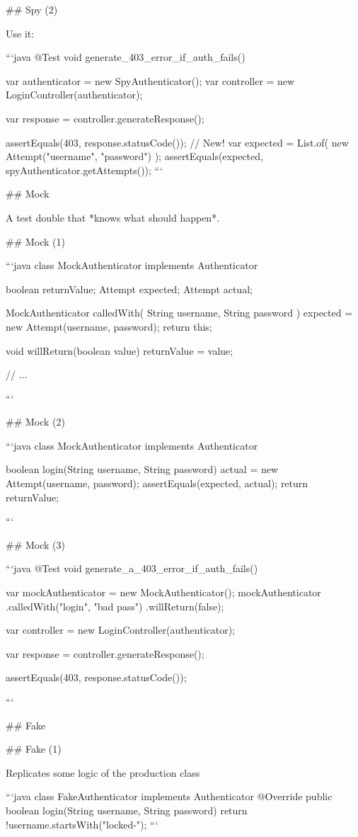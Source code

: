 ## Spy (2)

Use it:

```java
@Test
void generate_403_error_if_auth_fails() {
  var authenticator = new SpyAuthenticator();
  var controller = new LoginController(authenticator);

  var response = controller.generateResponse();

  assertEquals(403, response.statusCode());
  // New!
  var expected = List.of(
    new Attempt("username", "password")
  );
  assertEquals(expected, spyAuthenticator.getAttempts());
```

## Mock

A test double that *knows what should happen*.

## Mock (1)


```java
class MockAuthenticator implements Authenticator {
  boolean returnValue;
  Attempt expected;
  Attempt actual;

  MockAuthenticator calledWith(
    String username,
    String password
  ) {
    expected = new Attempt(username, password);
    return this;
  }

  void willReturn(boolean value) {
    returnValue = value;
  }

  // ...
}
```


## Mock (2)

```java
class MockAuthenticator implements Authenticator {

  boolean login(String username, String password) {
    actual = new Attempt(username, password);
    assertEquals(expected, actual);
    return returnValue;
  }
}
```

## Mock (3)

```java
@Test
void generate_a_403_error_if_auth_fails() {
  var mockAuthenticator = new MockAuthenticator();
  mockAuthenticator
    .calledWith("login", "bad pass")
    .willReturn(false);

  var controller = new LoginController(authenticator);

  var response = controller.generateResponse();

  assertEquals(403, response.statusCode());
}
```

## Fake

## Fake (1)

Replicates some logic of the production class

```java
class FakeAuthenticator implements Authenticator {
  @Override
  public boolean login(String username, String password) {
    return !username.startsWith("locked-");
  }
}
```

}
